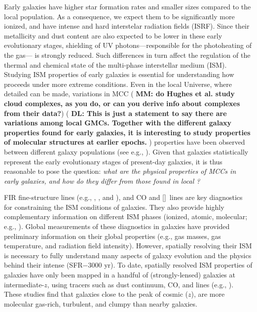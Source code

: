 \IfFileExists{emulateapjlegacy.cls}{\documentclass[iop]{emulateapjlegacy}}{\documentclass[iop]{emulateapj}}
\newcommand{\DL}[1]{({\bf \color{dlcolor} DL: #1})}
\newcommand{\MM}[1]{({\bf \color{mmcolor} MM: #1})}
\begin{document}
Early galaxies have higher star formation rates \citep[SFR; ][]{Behroozi13b, Sparre15a, Maiolino15a, Dunlop17a} and smaller sizes \citep[e.g.,][]{Bouwens11a, Ono13a} compared to the local population. 
%
As a consequence, we expect them to be significantly more ionized, and have intense and hard interstelar radiation fields (ISRF). Since their metallicity and dust content are also expected to be lower in these early evolutionary stages, shielding of UV photons---responsible for the photoheating of the gas---  is strongly reduced. Such differences in turn affect the regulation of the thermal and chemical state of the multi-phase interstellar medium (ISM). Studying ISM properties of early galaxies is essential for understanding how \SF proceeds under more extreme conditions.
%
Even in the local Universe, where detailed \obs can be made, variations in 
     MCC  \MM{do Hughes et al. study cloud complexes, as you do, or can you derive info about complexes from their data?}
     \DL{This is just a statement to say there are variations among local GMCs. Together with the different galaxy properties found for early galaxies, it is interesting to study properties of molecular structures at earlier epochs. }
properties have been observed between different galaxy populations (see e.g., \citealt{Hughes10a, Hughes13b}).  Given that \highz galaxies statistically represent the early evolutionary stages of present-day galaxies, it is thus reasonable to pose the question: {\it what are the physical properties of MCCs in early galaxies, and how do they differ from those found in local \galpop?}
%

FIR fine-structure lines (e.g., \cii, \nii, and \oiii), and CO and [\ci]~lines are key diagnostics for constraining the ISM conditions of galaxies. They also provide highly complementary information on different ISM phases (ionized, atomic, molecular; e.g., \citealt{Scoville74a, Rubin85a, Malhotra01a}).
%
Global measurements of these diagnostics in \highz galaxies have provided preliminary information on their global properties (e.g., gas masses, gas temperature, and radiation field intensity). However, spatially resolving their ISM is necessary to fully understand many aspects of galaxy evolution and the physics behind their intense \SF (SFR$-$3000\,\Msun\,yr\pmOne).
%
To date, spatially resolved ISM properties of \highz galaxies have only been mapped in a handful of (strongly-lensed) galaxies at intermediate-$z$, using tracers such as dust continuum, CO, and \cii lines (e.g., \citealt{Swinbank11a, Hodge15a, Ferkinhoff15a, Hodge16a, Leung19a}). These studies find that galaxies close to the peak of cosmic \SF ($z$), are more molecular gas-rich, turbulent, and clumpy than nearby galaxies.
\end{document}

